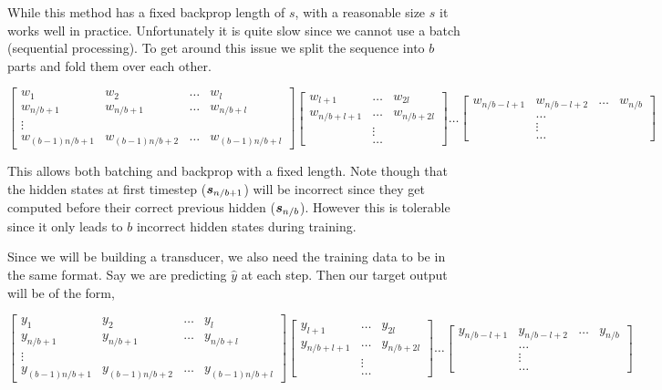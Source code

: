 \documentclass[11pt]{article}
\begin{document}
While this method has a fixed backprop length of $s$, with a reasonable 
size $s$ it works well in practice. Unfortunately it is quite slow since 
we cannot use a batch (sequential processing). To get around this issue 
we split the sequence into $b$ parts and fold them over each other. 



\[
  \begin{bmatrix}
    w_1 & w_2 & \ldots & w_{l}\\
    w_{n/b+1} & w_{n/b+1} & \ldots & w_{n/b+l}\\
    \vdots \\
    w_{(b-1)n/b + 1} & w_{(b-1)n/b+2} & \ldots & w_{(b-1)n/b+l}
  \end{bmatrix}   \begin{bmatrix}
    w_{l+1} &  \ldots & w_{2l} \\
    w_{n/b+l+1} &  \ldots & w_{n/b+2l}\\
    & \vdots & \\
    & \ldots &  
  \end{bmatrix}
  \ldots
  \begin{bmatrix}
    w_{n/b-l+1} & w_{n/b-l+2} & \ldots & w_{n/b}\\
    & \ldots & \\
    & \vdots & \\
    & \ldots & 
  \end{bmatrix}
\] 

This allows both batching and backprop with a fixed length. Note
though that the hidden states at first timestep ($\boldsymbol{s}_{n/b+1}$)
will be incorrect since they get computed before their correct
previous hidden ($\boldsymbol{s}_{n/b}$). However this is tolerable since it
only leads to $b$ incorrect hidden states during training.




Since we will be building a transducer, we also need the training 
data to be in the same format. Say we are predicting $\hat{y}$ at 
each step. Then our target output will be of the form, 

\[
  \begin{bmatrix}
    y_1 & y_2 & \ldots & y_{l}\\
    y_{n/b+1} & y_{n/b+1} & \ldots & y_{n/b+l}\\
    \vdots \\
    y_{(b-1)n/b + 1} & y_{(b-1)n/b+2} & \ldots & y_{(b-1)n/b+l}
  \end{bmatrix}   \begin{bmatrix}
    y_{l+1} &  \ldots & y_{2l} \\
    y_{n/b+l+1} &  \ldots & y_{n/b+2l}\\
    & \vdots & \\
    & \ldots &  
  \end{bmatrix}
  \ldots
  \begin{bmatrix}
    y_{n/b-l+1} & y_{n/b-l+2} & \ldots & y_{n/b}\\
    & \ldots & \\
    & \vdots & \\
    & \ldots & 
  \end{bmatrix}
\] 
\end{document}

